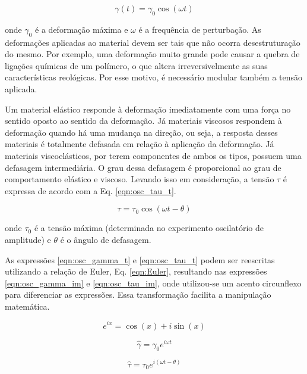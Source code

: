 			\begin{equation}
				\gamma(t)=\gamma_0\cos(\omega t)
				\label{eqn:osc_gamma_t}
			\end{equation}
			
			\noindent onde \(\gamma_0\) é a deformação máxima e \(\omega\) é a frequência de perturbação. As deformações aplicadas ao material devem ser tais que não ocorra desestruturação do mesmo. Por exemplo, uma deformação muito grande pode causar a quebra de ligações químicas de um polímero, o que altera irreversivelmente as suas características reológicas. Por esse motivo, é necessário modular também a tensão aplicada.
			
			Um material elástico responde à deformação imediatamente com uma força no sentido oposto ao sentido da deformação. Já materiais viscosos respondem à deformação quando há uma mudança na direção, ou seja, a resposta desses materiais é totalmente defasada em relação à aplicação da deformação. Já materiais viscoelásticos, por terem componentes de ambos os tipos, possuem uma defasagem intermediária. O grau dessa defasagem é proporcional ao grau de comportamento elástico e viscoso. Levando isso em consideração, a tensão \(\tau\)  é expressa de acordo com a Eq. \ref{eqn:osc_tau_t}.
			
			\begin{equation}
				\tau = \tau_0\cos(\omega t - \theta)
				\label{eqn:osc_tau_t}
			\end{equation}
			
			\noindent onde \(\tau_0\) é a tensão máxima (determinada no experimento oscilatório de amplitude) e \(\theta\) é o ângulo de defasagem.
			
			As expressões \ref{eqn:osc_gamma_t} e \ref{eqn:osc_tau_t} podem ser reescritas utilizando a relação de Euler, Eq. \ref{eqn:Euler}, resultando nas expressões \ref{eqn:osc_gamma_im} e \ref{eqn:osc_tau_im}, onde utilizou-se um acento circunflexo para diferenciar as expressões. Essa transformação facilita a manipulação matemática.
			
			\begin{equation}
				e^{ix} = \cos(x) + i\sin(x)
				\label{eqn:Euler}
			\end{equation}
			
			\begin{equation}
				\hat{\gamma} = \gamma_0 e^{i\omega t}
				\label{eqn:osc_gamma_im}
			\end{equation}
			
			\begin{equation}
				\hat{\tau} = \tau_0 e^{i(\omega t - \theta)}
				\label{eqn:osc_tau_im}
			\end{equation}
			
